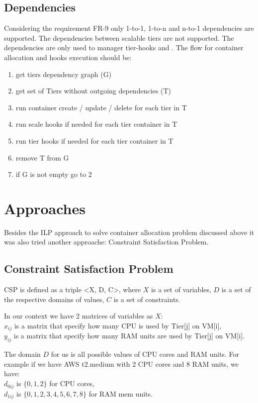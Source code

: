 \subsection{Dependencies}
Considering the requirement FR-9 only 1-to-1, 1-to-n and n-to-1 dependencies are supported. The dependencies between scalable tiers are not supported. The dependencies are only used to manager tier-hooks and . 
The flow for container allocation and hooks execution should be:
\begin{enumerate}
    \item get tiers dependency graph (G)
    \item get set of Tiers without outgoing dependencies (T)
    \item run container create / update / delete for each tier in T
    \item run scale hooks if needed for each tier container in T
    \item run tier hooks if needed for each tier container in T
    \item remove T from G
    \item if G is not empty go to 2
\end{enumerate}

\section{Approaches}
Besides the ILP approach to solve container allocation problem discussed above it was also tried another approache: Constraint Satisfaction Problem.

\subsection{Constraint Satisfaction Problem}

CSP is defined as a triple \textless X, D, C\textgreater, where $X$ is a set of variables, $D$ is a set of the respective domains of values, $C$ is a set of constraints.

In our context we have 2 matrices of variables as $X$: \\
$x_{ij}$ is a matrix that specify how many CPU is used by Tier[j] on VM[i],\\
$y_{ij}$ is a matrix that specify how many RAM units are used by Tier[j] on VM[i].

The domain $D$ for us is all possible values of CPU cores and RAM units. For example if we have AWS t2.medium with 2 CPU cores and 8 RAM units, we have: \\
$d_{0ij}$ is $\{0, 1, 2\}$ for CPU cores,\\
$d_{1ij}$ is $\{0, 1, 2, 3, 4, 5, 6, 7, 8\}$ for RAM mem units.


